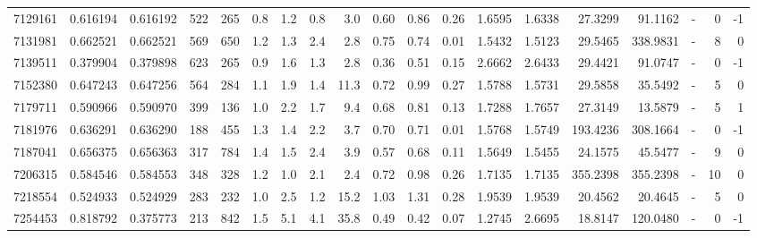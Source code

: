 \begin{tabular}{rrrrrrrrrrrrrrrrlrr}
   7129161 & 0.616194 &   0.616192 &  522 &  265 &      0.8 &      1.2 &     0.8 &      3.0 &       0.60 &        0.86 &        0.26 &  1.6595 &  1.6338 &   27.3299 &   91.1162 &             - &        0 &         -1 \\
   7131981 & 0.662521 &   0.662521 &  569 &  650 &      1.2 &      1.3 &     2.4 &      2.8 &       0.75 &        0.74 &        0.01 &  1.5432 &  1.5123 &   29.5465 &  338.9831 &             - &        8 &          0 \\
   7139511 & 0.379904 &   0.379898 &  623 &  265 &      0.9 &      1.6 &     1.3 &      2.8 &       0.36 &        0.51 &        0.15 &  2.6662 &  2.6433 &   29.4421 &   91.0747 &             - &        0 &         -1 \\
   7152380 & 0.647243 &   0.647256 &  564 &  284 &      1.1 &      1.9 &     1.4 &     11.3 &       0.72 &        0.99 &        0.27 &  1.5788 &  1.5731 &   29.5858 &   35.5492 &             - &        5 &          0 \\
   7179711 & 0.590966 &   0.590970 &  399 &  136 &      1.0 &      2.2 &     1.7 &      9.4 &       0.68 &        0.81 &        0.13 &  1.7288 &  1.7657 &   27.3149 &   13.5879 &             - &        5 &          1 \\
   7181976 & 0.636291 &   0.636290 &  188 &  455 &      1.3 &      1.4 &     2.2 &      3.7 &       0.70 &        0.71 &        0.01 &  1.5768 &  1.5749 &  193.4236 &  308.1664 &             - &        0 &         -1 \\
   7187041 & 0.656375 &   0.656363 &  317 &  784 &      1.4 &      1.5 &     2.4 &      3.9 &       0.57 &        0.68 &        0.11 &  1.5649 &  1.5455 &   24.1575 &   45.5477 &             - &        9 &          0 \\
   7206315 & 0.584546 &   0.584553 &  348 &  328 &      1.2 &      1.0 &     2.1 &      2.4 &       0.72 &        0.98 &        0.26 &  1.7135 &  1.7135 &  355.2398 &  355.2398 &             - &       10 &          0 \\
   7218554 & 0.524933 &   0.524929 &  283 &  232 &      1.0 &      2.5 &     1.2 &     15.2 &       1.03 &        1.31 &        0.28 &  1.9539 &  1.9539 &   20.4562 &   20.4645 &             - &        5 &          0 \\
   7254453 & 0.818792 &   0.375773 &  213 &  842 &      1.5 &      5.1 &     4.1 &     35.8 &       0.49 &        0.42 &        0.07 &  1.2745 &  2.6695 &   18.8147 &  120.0480 &             - &        0 &         -1 \\

\end{tabular}
